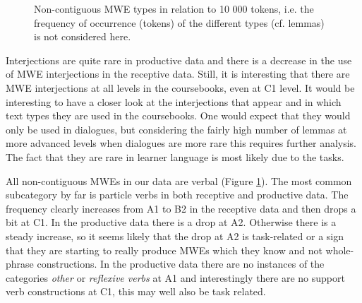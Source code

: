 \documentclass[output=paper,colorlinks,citecolor=brown]{langscibook}
\begin{document}
\begin{figure}[p]
    \newdimen\DimenTickLabelWidth
    \settowidth{\DimenTickLabelWidth}{prod.}
    \ChapterNineTableSix
    \caption{Non-contiguous MWE types in relation to 10 000 tokens, i.e. the frequency of occurrence (tokens) of the different types (cf. lemmas) is not considered here.}
    \label{fig:MWEtypes10000}
\end{figure}

Interjections are quite rare in productive data and there is a decrease in the use of MWE interjections in the receptive data. Still, it is interesting that there are MWE interjections at all levels in the coursebooks, even at C1 level. It would be interesting to have a closer look at the interjections that appear and in which text types they are used in the coursebooks. One would expect that they would only be used in dialogues, but considering the fairly high number of lemmas at more advanced levels when dialogues are more rare this requires further analysis. The fact that they are rare in learner language is most likely due to the tasks.

All non-contiguous MWEs in our data are verbal (Figure \ref{fig:MWEtypes10000}). 
The most common subcategory by far is particle verbs in both receptive and productive data. The frequency clearly increases from A1 to B2 in the receptive data and then drops a bit at C1. In the productive data there is a drop at A2. Otherwise there is a steady increase, so it seems likely that the drop at A2 is task-related or a sign that they are starting to really produce MWEs which they know and not whole-phrase constructions. In the productive data there are no instances of the categories \textit{other} or \textit{reflexive verbs} at A1 and interestingly there are no support verb constructions at C1, this may well also be task related. 
\end{document}
